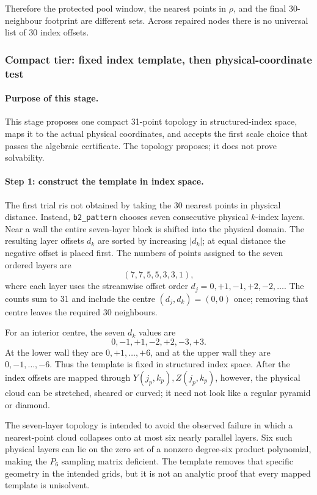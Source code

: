 \documentclass[11pt,a4paper]{article}
\begin{document}
Therefore the protected pool window, the nearest points in $\rho$, and the final
30-neighbour footprint are different sets. Across repaired nodes there is no universal
list of 30 index offsets.

\subsubsection{Compact tier: fixed index template, then physical-coordinate test}
\label{sec:project-compact-tier}

\paragraph{Purpose of this stage.}
This stage proposes one compact 31-point topology in structured-index space, maps it to
the actual physical coordinates, and accepts the first scale choice that passes the
algebraic certificate. The topology proposes; it does not prove solvability.

\paragraph{Step 1: construct the template in index space.}
The first trial ris not obtained by taking the 30 nearest points in physical distance.
Instead, \texttt{b2\_pattern} chooses seven consecutive physical $k$-index layers. Near a
wall the entire seven-layer block is shifted into the physical domain. The resulting
layer offsets $d_k$ are sorted by increasing $|d_k|$; at equal distance the negative
offset is placed first. The numbers of points assigned to the seven ordered layers are
\begin{equation}
 (7,7,5,5,3,3,1),
 \label{eq:pyramid-counts}
\end{equation}
where each layer uses the streamwise offset order
$d_j=0,+1,-1,+2,-2,\ldots$. The counts sum to 31 and include the centre
$(d_j,d_k)=(0,0)$ once; removing that centre leaves the required 30 neighbours.

For an interior centre, the seven $d_k$ values are
\[
 0,-1,+1,-2,+2,-3,+3.
\]
At the lower wall they are $0,+1,\ldots,+6$, and at the upper wall they are
$0,-1,\ldots,-6$. Thus the template is fixed in structured index space. After the index
offsets are mapped through $Y(j_p,k_p),Z(j_p,k_p)$, however, the physical cloud can be
stretched, sheared or curved; it need not look like a regular pyramid or diamond.

The seven-layer topology is intended to avoid the observed failure in which a
nearest-point cloud collapses onto at most six nearly parallel layers. Six such physical
layers can lie on the zero set of a nonzero degree-six product polynomial, making the
$P_6$ sampling matrix deficient. The template removes that specific geometry in the
intended grids, but it is not an analytic proof that every mapped template is unisolvent.
\end{document}
